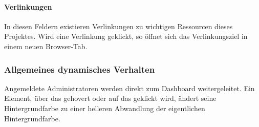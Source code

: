\paragraph*{Verlinkungen}
In diesen Feldern existieren Verlinkungen zu wichtigen Ressourcen dieses Projektes.
Wird eine Verlinkung geklickt, so öffnet sich das Verlinkungsziel in einem neuen Browser-Tab.

\subsubsection{Allgemeines dynamisches Verhalten}
Angemeldete Administratoren werden direkt zum Dashboard weitergeleitet.
Ein Element, über das gehovert oder auf das geklickt wird, ändert seine Hintergrundfarbe zu einer helleren Abwandlung der eigentlichen Hintergrundfarbe.
